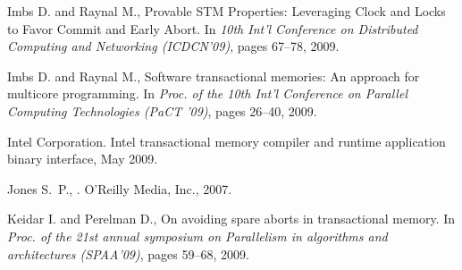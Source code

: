 \begin{thebibliography}{99}
{%



Imbs D. and Raynal M.,
Provable STM Properties: Leveraging Clock and Locks to Favor Commit 
and Early Abort.
In {\it 10th Int'l Conference on Distributed Computing and  Networking
(ICDCN'09)}, pages 67--78, 2009.





Imbs D. and Raynal M.,
\newblock Software transactional memories: An approach for multicore
  programming.
\newblock In {\em Proc. of the 10th Int'l Conference on
  Parallel Computing Technologies (PaCT '09)}, pages 26--40, 2009.



{Intel Corporation}.
\newblock Intel transactional memory compiler and runtime application binary
  interface, May 2009.



Jones S.~P.,
.
\newblock O'Reilly Media, Inc., 2007.





Keidar I. and Perelman D.,
\newblock On avoiding spare aborts in transactional memory.
\newblock In {\em Proc. of the 21st annual symposium on
  Parallelism in algorithms and architectures (SPAA'09)}, pages 59--68, 2009.


}
\end{thebibliography}
